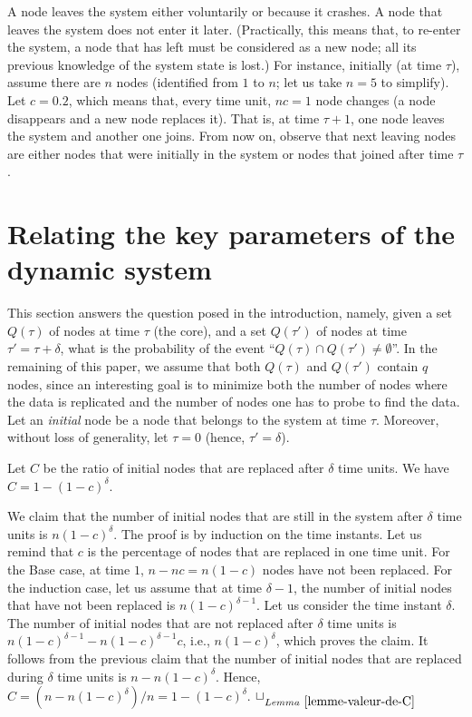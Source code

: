 \documentclass[]{llncs}
\newcommand{\toto}{xxx}
\newenvironment{proofL}{\noindent{\bf
Proof }} {\hspace*{\fill}$\Box_{Lemma~\ref{\toto}}$\par\vspace{3mm}}
\begin{document}
A node leaves the system either voluntarily or because it crashes.  
A node that leaves the system  does not enter it later.  (Practically, 
this means that, to re-enter the system, a node that has left 
must be considered as a new node; all its previous knowledge of the system 
state is lost.) 
For instance, initially (at time $\tau$), assume 
there  are $n$ nodes  (identified  from  $1$ to
$n$; let us take $n=5$ to  simplify).  Let $c=0.2$, which means that, 
every time unit,  $nc=1$  node changes (a node disappears and a new 
node replaces it).  
That is, at time $\tau+1$, one node leaves the system and another one
joins.  From now on, observe that next leaving nodes are either
nodes that were initially in the system or nodes that joined
after time $\tau$.





\section{Relating the key parameters of the dynamic system}
\label{sec:analysis}

This   section answers the  question posed  in the  introduction, namely,
given a  set $Q(\tau)$ of nodes  at time $\tau$  (the core), 
and  a set  $Q(\tau')$ of  nodes at   time  $\tau'=\tau+\delta$, what
is the  probability  of the event ``$Q(\tau)\cap Q(\tau')\neq\emptyset$''. 
In the remaining of this paper, we assume that both $Q(\tau)$ and $Q(\tau')$ 
contain $q$ nodes, since an interesting goal is to minimize both the 
number of nodes where the data is replicated and the number of nodes one has 
to probe to find the data.
Let an  {\it initial} node  be a  node that belongs  to the system  at time
$\tau$.  Moreover,  without  loss   of  generality,  let  $\tau=0$  (hence,
$\tau'=\delta$). 

\begin{lemma}
\label{lemme-valeur-de-C}
Let $C$ be the ratio of initial nodes that are replaced after
$\delta$ time units. We have $C=1-(1-c)^\delta$. 
\end{lemma}

\begin{proofL}
We claim that the number of initial nodes that are still in the system
after $\delta$ time units is $n(1-c)^{\delta}$. 
The proof is by  induction on the time instants. Let us  remind that $c$ is
the percentage of nodes that are replaced in one time unit. 
For the Base case, at  time $1$,  $n-n c=n(1-c)$  nodes have  not been
replaced. 
For the induction case, let us assume  that at time $\delta-1$, the number of
initial nodes  that have  not been replaced is $n(1-c)^{\delta-1}$. 
Let us  consider the  time instant  $\delta$.  
The number of initial nodes that are not replaced after $\delta$ time units
is  $n(1-c)^{\delta-1}  - n(1-c)^{\delta-1}c$, i.e.,  $n(1-c)^{\delta}$,
which proves the claim. 
It follows from the previous claim that the number of initial nodes that are 
replaced during $\delta$ time  units is $n-n(1-c)^\delta$. 
Hence, $C= (n-n(1-c)^\delta)/n= 1-(1-c)^\delta$. 
\renewcommand{\toto}{lemme-valeur-de-C}
\end{proofL}
\end{document}
